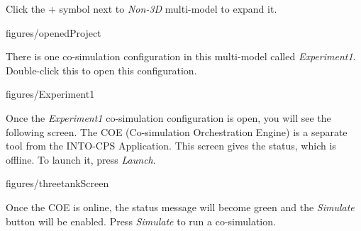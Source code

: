 \documentclass[11pt,a4paper]{../tutorial}
\begin{document}
\begin{instructions}
\item Click the + symbol next to \emph{Non-3D} multi-model to expand it.

    \begin{annotation}[width=0.53\linewidth,trim=0 0 250 200,clip]{figures/openedProject}
    \end{annotation}

\newpage
\item There is one co-simulation configuration in this multi-model called \emph{Experiment1}. Double-click this to open this configuration.

    \begin{annotation}[width=0.53\linewidth,trim=0 0 250 200,clip]{figures/Experiment1}
    \end{annotation}

\item \label{step:launch} Once the \emph{Experiment1} co-simulation configuration is open, you will see the following screen. The COE (Co-simulation Orchestration Engine) is a separate tool from the INTO-CPS Application. This screen gives the status, which is offline. To launch it, press \emph{Launch}.

    \begin{annotation}[width=0.85\linewidth,trim=0 0 0 0,clip]{figures/threetankScreen}
    \end{annotation}

%

\item Once the COE is online, the status message will become green and the \emph{Simulate} button will be enabled. Press \emph{Simulate} to run a co-simulation.


\end{instructions}
\end{document}
